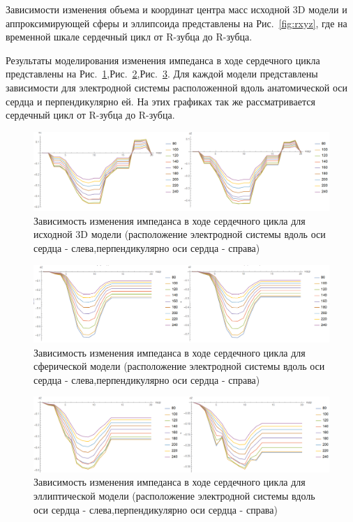 \documentclass[conference]{IEEEtran}
\begin{document}
Зависимости изменения объема и координат центра масс исходной 3D модели и аппроксимирующей сферы и эллипсоида представлены на Рис.~\ref{fig:rxyz},
где на временной шкале сердечный цикл от R-зубца до R-зубца.

Результаты моделирования изменения импеданса в ходе сердечного цикла представлены на Рис.~\ref{real},Рис.~\ref{fig:sphere},Рис.~\ref{fig:ellipse}.
Для каждой модели представлены зависимости для электродной системы расположенной вдоль анатомической оси сердца и перпендикулярно ей.
На этих графиках так же рассматривается сердечный цикл от R-зубца до R-зубца.

\begin{figure}[tbph]
    \centering
    \includegraphics[width=\linewidth]{fig/real}
    \caption{Зависимость изменения импеданса в ходе сердечного цикла для исходной 3D модели (расположение электродной системы вдоль оси сердца - слева,перпендикулярно оси сердца - справа)}
    \label{real}
\end{figure}

\begin{figure}[tbph]
    \centering
    \includegraphics[width=\linewidth]{fig/sphere}
    \caption{Зависимость изменения импеданса в ходе сердечного цикла для сферической модели (расположение электродной системы вдоль оси сердца - слева,перпендикулярно оси сердца - справа)}
    \label{fig:sphere}
\end{figure}

\begin{figure}[tbph]
    \centering
    \includegraphics[width=\linewidth]{ellipse}
    \caption{Зависимость изменения импеданса в ходе сердечного цикла для эллиптической модели (расположение электродной системы вдоль оси сердца - слева,перпендикулярно оси сердца - справа)}
    \label{fig:ellipse}
\end{figure}
\end{document}
